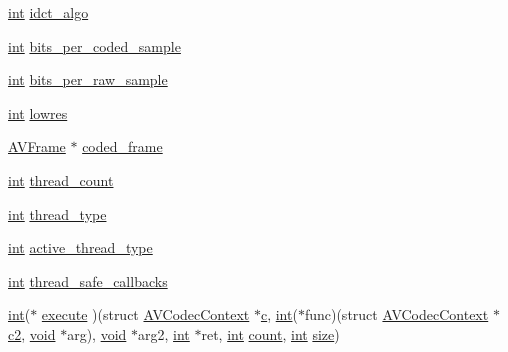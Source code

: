 \begin{DoxyCompactItemize}
\item 
\hyperlink{xmltok_8h_a5a0d4a5641ce434f1d23533f2b2e6653}{int} \hyperlink{struct_a_v_codec_context_a8b669e043c8b064fcf991fd71e16a870}{idct\+\_\+algo}
\item 
\hyperlink{xmltok_8h_a5a0d4a5641ce434f1d23533f2b2e6653}{int} \hyperlink{struct_a_v_codec_context_a5273a8cf73ef598d632c6eee1379d5ad}{bits\+\_\+per\+\_\+coded\+\_\+sample}
\item 
\hyperlink{xmltok_8h_a5a0d4a5641ce434f1d23533f2b2e6653}{int} \hyperlink{struct_a_v_codec_context_a889b84d5b3657df4a4e45b17b87848f5}{bits\+\_\+per\+\_\+raw\+\_\+sample}
\item 
\hyperlink{xmltok_8h_a5a0d4a5641ce434f1d23533f2b2e6653}{int} \hyperlink{struct_a_v_codec_context_af260210a39ad4781d8d47ddac1541d04}{lowres}
\item 
\hyperlink{struct_a_v_frame}{A\+V\+Frame} $\ast$ \hyperlink{struct_a_v_codec_context_afdebc347b4f74e0b9271ff37cabc96e8}{coded\+\_\+frame}
\item 
\hyperlink{xmltok_8h_a5a0d4a5641ce434f1d23533f2b2e6653}{int} \hyperlink{struct_a_v_codec_context_aa852b6227d0778b62e9cc4034ad3720c}{thread\+\_\+count}
\item 
\hyperlink{xmltok_8h_a5a0d4a5641ce434f1d23533f2b2e6653}{int} \hyperlink{struct_a_v_codec_context_a7651614f4309122981d70e06a4b42fcb}{thread\+\_\+type}
\item 
\hyperlink{xmltok_8h_a5a0d4a5641ce434f1d23533f2b2e6653}{int} \hyperlink{struct_a_v_codec_context_a5f4579d94675579e1d46a591340f598f}{active\+\_\+thread\+\_\+type}
\item 
\hyperlink{xmltok_8h_a5a0d4a5641ce434f1d23533f2b2e6653}{int} \hyperlink{struct_a_v_codec_context_a5bd9a6f252d615243d01198fd3957fd8}{thread\+\_\+safe\+\_\+callbacks}
\item 
\hyperlink{xmltok_8h_a5a0d4a5641ce434f1d23533f2b2e6653}{int}($\ast$ \hyperlink{struct_a_v_codec_context_a83b625bf9454b63ee8c04ac4f8ef648c}{execute} )(struct \hyperlink{struct_a_v_codec_context}{A\+V\+Codec\+Context} $\ast$\hyperlink{rfft2d_test_m_l_8m_ae0323a9039add2978bf5b49550572c7c}{c}, \hyperlink{xmltok_8h_a5a0d4a5641ce434f1d23533f2b2e6653}{int}($\ast$func)(struct \hyperlink{struct_a_v_codec_context}{A\+V\+Codec\+Context} $\ast$\hyperlink{convtest_8m_a09ab2f3b6c61c793c7b6d24912b2cea0}{c2}, \hyperlink{sound_8c_ae35f5844602719cf66324f4de2a658b3}{void} $\ast$arg), \hyperlink{sound_8c_ae35f5844602719cf66324f4de2a658b3}{void} $\ast$arg2, \hyperlink{xmltok_8h_a5a0d4a5641ce434f1d23533f2b2e6653}{int} $\ast$ret, \hyperlink{xmltok_8h_a5a0d4a5641ce434f1d23533f2b2e6653}{int} \hyperlink{metrics_8c_afea6e77db19a2f8c91419904fe665a3a}{count}, \hyperlink{xmltok_8h_a5a0d4a5641ce434f1d23533f2b2e6653}{int} \hyperlink{group__lavu__mem_ga854352f53b148adc24983a58a1866d66}{size})

\end{DoxyCompactItemize}
